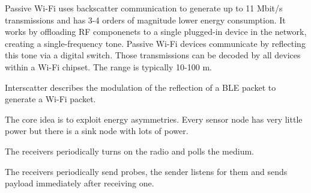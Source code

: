 \begin{mytitle}[Passive Wi-Fi] Passive Wi-Fi uses backscatter communication to generate up to 11 Mbit/s transmissions and has 3-4 orders of magnitude lower energy consumption. It works by offloading RF componenets to a single plugged-in device in the network, creating a single-frequency tone. Passive Wi-Fi devices communicate by reflecting this tone via a digital switch. Those transmissions can be decoded by all devices within a Wi-Fi chipset. The range is typically 10-100 m.
\end{mytitle}
\begin{mytitle}[Interscatter] Interscatter describes the modulation of the reflection of a BLE packet to generate a Wi-Fi packet.
\end{mytitle}
\begin{mytitle} The core idea is to exploit energy asymmetries. Every sensor node has very little power but there is a sink node with lots of power.
    \begin{mysubtitle} The receivers periodically turns on the radio and polls the medium.
    \end{mysubtitle}
    \begin{mysubtitle} The receivers periodically send probes, the sender listens for them and sends payload immediately after receiving one.
    \end{mysubtitle}
\end{mytitle}

